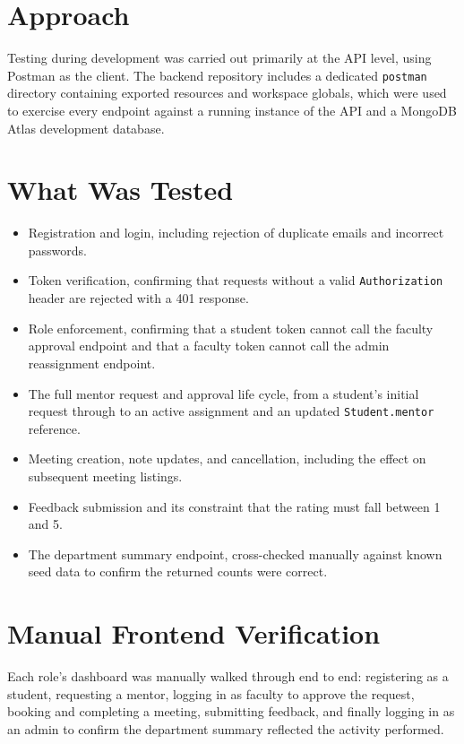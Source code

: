 \documentclass[12pt,a4paper]{report}
\newcommand{\sectionrule}{\vspace{-4pt}{\color{lightgray}\hrule height 1pt}\vspace{8pt}}
\begin{document}
\section{Approach}
\sectionrule
Testing during development was carried out primarily at the API level, using Postman as the client. The backend repository includes a dedicated \texttt{postman} directory containing exported resources and workspace globals, which were used to exercise every endpoint against a running instance of the API and a MongoDB Atlas development database.

\section{What Was Tested}
\sectionrule
\begin{itemize}[itemsep=2pt]
  \item Registration and login, including rejection of duplicate emails and incorrect passwords.
  \item Token verification, confirming that requests without a valid \texttt{Authorization} header are rejected with a 401 response.
  \item Role enforcement, confirming that a student token cannot call the faculty approval endpoint and that a faculty token cannot call the admin reassignment endpoint.
  \item The full mentor request and approval life cycle, from a student's initial request through to an active assignment and an updated \texttt{Student.mentor} reference.
  \item Meeting creation, note updates, and cancellation, including the effect on subsequent meeting listings.
  \item Feedback submission and its constraint that the rating must fall between 1 and 5.
  \item The department summary endpoint, cross-checked manually against known seed data to confirm the returned counts were correct.
\end{itemize}

\section{Manual Frontend Verification}
\sectionrule
Each role's dashboard was manually walked through end to end: registering as a student, requesting a mentor, logging in as faculty to approve the request, booking and completing a meeting, submitting feedback, and finally logging in as an admin to confirm the department summary reflected the activity performed.
\end{document}
